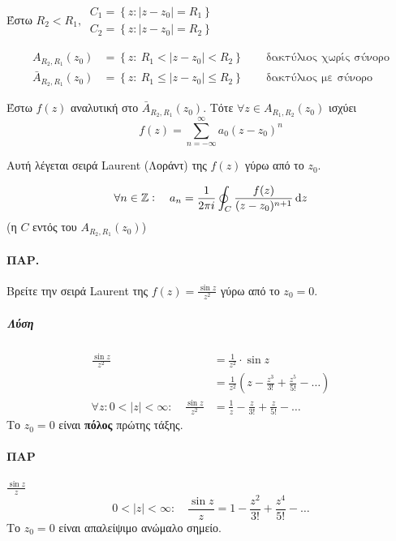 \documentclass[12pt,a4paper,titlepage,fleqn]{article}
\begin{document}
  \begin{theorem*}{}
  	Έστω \( R_2 < R_1,\ \begin{array}{l}
  	C_1 = \left\lbrace z:|z-z_0| = R_1 \right\rbrace \\
  	C_2 = \left\lbrace z:|z-z_0| = R_2 \right\rbrace 
  	\end{array} \)
  	
  	\begin{align*}
  	A_{R_2,R_1}(z_0) &= \left\lbrace 
  	z:\ R_1 < |z-z_0| < R_2
  	 \right\rbrace \qquad \text{δακτύλιος χωρίς σύνορο} \\
  	\bar A_{R_2,R_1}(z_0) &= \left\lbrace 
  	z:\ R_1 \leq | z - z_0 | \leq R_2
  	 \right\rbrace \qquad \text{δακτύλιος με σύνορο}
  	\end{align*}
  	
  	
  	Έστω \( f(z) \) αναλυτική στο \( \bar A_{R_2,R_1}(z_0) \). Τότε \( \forall z
  	\in A_{R_1,R_2}(z_0) \) ισχύει \[
  	f(z) = \sum_{n=-\infty}^\infty a_0 (z-z_0)^n
  	\]
  	
  	Αυτή λέγεται σειρά Laurent (Λοράντ) της \( f(z) \) γύρω από το \( z_0 \).
  	
  	\[
  	\forall n \in \mathbb Z: \quad a_n=\frac{1}{2\pi i}\oint_C
  	\frac{f(z)}{(z-z_0)^{n+1}}\dif z
  	\] (η \( C \) εντός του \( A_{R_2,R_1}(z_0) \))
  \end{theorem*}
  
  \paragraph{ΠΑΡ.}
  Βρείτε την σειρά Laurent της \( f(z) = \frac{\sin z}{z^2} \) γύρω από το
  \( z_0 = 0 \).
  \subparagraph{Λύση}
  \begin{align*}
  \frac{\sin z}{z^2}&=\frac{1}{z^2}\cdot \sin z 
  \\ &= \frac{1}{z^2}\left( z-\frac{z^3}{3!}+\frac{z^5}{5!}-\dots \right)
  \\ \forall z: 0<|z|<\infty: \quad \frac{\sin z}{z^2} &= \frac{1}{z}-\frac{z}{3!}
  +\frac{z}{5!}-\dots
  \end{align*}
  Το \( z_0 = 0 \) είναι \textbf{πόλος} πρώτης τάξης.
  
  \paragraph{ΠΑΡ} \( \frac{\sin z}{z} \)
  \[
  0<|z|<\infty:\quad \frac{\sin z}{z} = 1-\frac{z^2}{3!}+\frac{z^4}{5!}-\dots
  \]
  Το \( z_0 = 0 \) είναι απαλείψιμο ανώμαλο σημείο.
  
\end{document}
